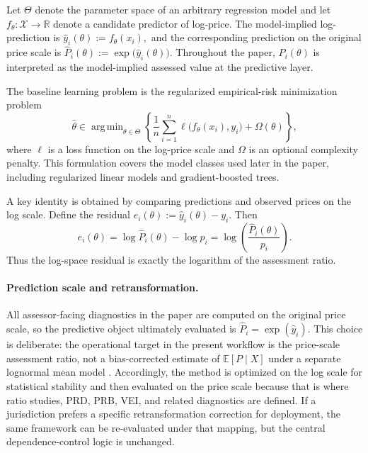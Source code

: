 \documentclass[12pt]{article}
\theoremstyle{plain}
\theoremstyle{definition}
\newcommand{\R}{\mathbb{R}}
\newcommand{\E}{\mathbb{E}}
\newcommand{\argmin}{\mathop{\mathrm{arg\,min}}}
\begin{document}
Let \(\Theta\) denote the parameter space of an arbitrary regression model and let \(f_\theta:\mathcal X\to\R\) denote a candidate predictor of log-price. The model-implied log-prediction is
$
\hat y_i(\theta):=f_\theta(x_i),
$
and the corresponding prediction on the original price scale is
$
\hat P_i(\theta):=\exp\bigl(\hat y_i(\theta)\bigr).
$
Throughout the paper, \(\hat P_i(\theta)\) is interpreted as the model-implied assessed value at the predictive layer.

The baseline learning problem is the regularized empirical-risk minimization problem
\begin{equation}
\label{eq:baseline_erm}
\hat\theta\in\argmin_{\theta\in\Theta}
\left\{
\frac{1}{n}\sum_{i=1}^n \ell\bigl(f_\theta(x_i),y_i\bigr)+\Omega(\theta)
\right\},
\end{equation}
where \(\ell\) is a loss function on the log-price scale and \(\Omega\) is an optional complexity penalty. This formulation covers the model classes used later in the paper, including regularized linear models and gradient-boosted trees.

A key identity is obtained by comparing predictions and observed prices on the log scale. Define the residual
$
e_i(\theta):=\hat y_i(\theta)-y_i.
$
Then
\begin{equation}
\label{eq:log_ratio_identity}
e_i(\theta)
=
\log \hat P_i(\theta)-\log p_i
=
\log\!\left(\frac{\hat P_i(\theta)}{p_i}\right).
\end{equation}
Thus the log-space residual is exactly the logarithm of the assessment ratio.

\paragraph{Prediction scale and retransformation.}
All assessor-facing diagnostics in the paper are computed on the original price scale, so the predictive object ultimately evaluated is \(\hat P_i=\exp(\hat y_i)\). This choice is deliberate: the operational target in the present workflow is the price-scale assessment ratio, not a bias-corrected estimate of \(\E[P\mid X]\) under a separate lognormal mean model . Accordingly, the method is optimized on the log scale for statistical stability and then evaluated on the price scale because that is where ratio studies, PRD, PRB, VEI, and related diagnostics are defined. If a jurisdiction prefers a specific retransformation correction for deployment, the same framework can be re-evaluated under that mapping, but the central dependence-control logic is unchanged.
\end{document}
